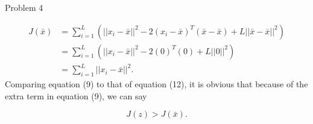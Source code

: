 \begin{problem}{Problem 4}
\begin{highlight}
        \begin{align}
            J(\bar{x}) & = \sum^{L}_{i = 1} (||x_{i} - \bar{x}||^{2} - 2(x_{i} - \bar{x})^{T}(\bar{x} - \bar{x}) + L||\bar{x} - \bar{x}||^{2}) \\
            & = \sum^{L}_{i = 1} (||x_{i} - \bar{x}||^{2} - 2(0)^{T}(0) + L||0||^{2}) \\
            & = \sum^{L}_{i = 1} ||x_{i} - \bar{x}||^{2}.
        \end{align}
        Comparing equation (9) to that of equation (12), it is obvious that because of the extra term in equation (9), we can say

        \begin{equation}
            J(z) > J(\bar{x}).
        \end{equation}
    \end{highlight}
\end{problem}

